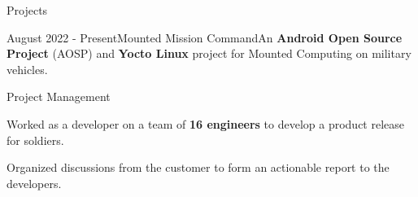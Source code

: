\documentclass{article}
\newlength{\tabin}
\newlength{\secsep}
\newcommand{\lineunder}{\vspace*{-8pt} \\ \hspace*{-6pt} \hrulefill \\ \vspace*{-15pt}}
\newenvironment{tabbedsection}[1]{
	\begin{list}{}{
			\setlength{\itemsep}{0pt}
			\setlength{\labelsep}{0pt}
			\setlength{\labelwidth}{0pt}
			\setlength{\leftmargin}{0pt}
			\setlength{\rightmargin}{\tabin}
			\setlength{\listparindent}{0pt}
			\setlength{\parsep}{0pt}
			\setlength{\parskip}{0pt}
			\setlength{\partopsep}{0pt}
			\setlength{\topsep}{#1}
		}
		\item[]
	}{\end{list}}
\newenvironment{resume_section}[1]{
	\filbreak
	\vspace{2\secsep}
	\textsc{\color{blue}\large#1}
	\lineunder
	\begin{tabbedsection}{\secsep}
	}{\end{tabbedsection}}
\newenvironment{resume_project_subsection}[3]{
	\textbf{\color{BlueViolet}#2} \hfill \hspace{-5em} {\normalsize (#1)}
	\\ {\small \textit{ #3}}
	\begin{tabbedsection}{0.5\secsep}
		\begin{subitems}
		}{\end{subitems}\end{tabbedsection}}
\newenvironment{subitems}{
	\renewcommand{\labelitemi}{-}
	\begin{itemize}
		\setlength{\labelsep}{1em}
	}{\end{itemize}}
\newenvironment{resume_skill_group}[1]{
	\hspace{-18pt}\textbf{#1}
	\begin{itemize}
	}{\end{itemize}}
\begin{document}
	\vspace{-3\secsep}
	
	\begin{resume_section}{Projects}
		\begin{resume_project_subsection}{August 2022 - Present}{Mounted Mission Command}{An \textbf{Android Open Source Project} (AOSP) and \textbf{Yocto Linux} project for Mounted Computing on military vehicles.}
			\begin{resume_skill_group}{Project Management}
				\item 
				\item 
				Worked as a developer on a team of \textbf{16 engineers} to develop a product release for soldiers. 
				\item 
				Organized discussions from the customer to form an actionable report to the developers.
				\iffalse
				\item 
				Formed most of the team’s documentation for testing, building, and development environments to support our team of developers that has doubled in size. 
				
				\fi
			\end{resume_skill_group}
			

\end{resume_project_subsection}
\end{resume_section}
\end{document}
